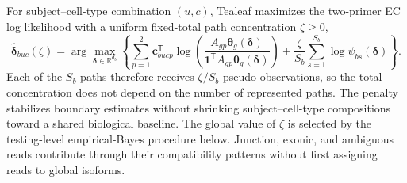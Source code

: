 \documentclass[11pt]{article}
\begin{document}
For subject--cell-type combination \((u,c)\), Tealeaf maximizes the two-primer EC log likelihood with a uniform fixed-total path concentration \(\zeta\geq0\), \[\widehat{\bm\delta}_{buc}(\zeta)=\arg\max_{\bm\delta\in\mathbb R^{d_b}}\left\{\sum_{p=1}^2\bm c_{bucp}^{\mathsf T}\log\left(\frac{A_{gp}\bm\theta_g(\bm\delta)}{\bm1^{\mathsf T}A_{gp}\bm\theta_g(\bm\delta)}\right)+\frac{\zeta}{S_b}\sum_{s=1}^{S_b}\log\psi_{bs}(\bm\delta)\right\}.\] Each of the \(S_b\) paths therefore receives \(\zeta/S_b\) pseudo-observations, so the total concentration does not depend on the number of represented paths. The penalty stabilizes boundary estimates without shrinking subject--cell-type compositions toward a shared biological baseline. The global value of \(\zeta\) is selected by the testing-level empirical-Bayes procedure below. Junction, exonic, and ambiguous reads contribute through their compatibility patterns without first assigning reads to global isoforms.
\end{document}
